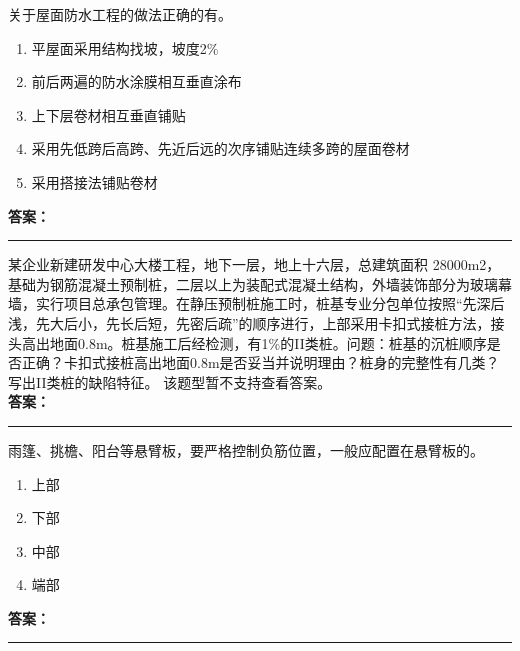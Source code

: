 \documentclass[UTF8,fontset=fandol,11pt]{ctexart}
\newcommand{\answerline}{\textcolor{answerred}{\rule{2.4cm}{0.7pt}}}
\begin{document}
\begin{quizbox}[title={乱序第 201 题｜第九章防水工程}]

关于屋面防水工程的做法正确的有。\\

\begin{enumerate}[label=\Alph*.]

\item 平屋面采用结构找坡，坡度2\%

\item 前后两遍的防水涂膜相互垂直涂布

\item 上下层卷材相互垂直铺贴

\item 采用先低跨后高跨、先近后远的次序铺贴连续多跨的屋面卷材

\item 采用搭接法铺贴卷材

\end{enumerate}

\textbf{\textcolor{answerred}{答案：}} \answerline

\end{quizbox}

\vspace{0.2em}

\begin{quizbox}[title={乱序第 202 题｜第二章桩基础工程}]

某企业新建研发中心大楼工程，地下一层，地上十六层，总建筑面积 28000m2，基础为钢筋混凝土预制桩，二层以上为装配式混凝土结构，外墙装饰部分为玻璃幕墙，实行项目总承包管理。在静压预制桩施工时，桩基专业分包单位按照“先深后浅，先大后小，先长后短，先密后疏”的顺序进行，上部采用卡扣式接桩方法，接头高出地面0.8m。桩基施工后经检测，有1\%的II类桩。问题：桩基的沉桩顺序是否正确？卡扣式接桩高出地面0.8m是否妥当并说明理由？桩身的完整性有几类？写出II类桩的缺陷特征。 该题型暂不支持查看答案。\\

\textbf{\textcolor{answerred}{答案：}} \answerline

\end{quizbox}

\vspace{0.2em}

\begin{quizbox}[title={乱序第 203 题｜第四章混凝土结构工程}]

雨篷、挑檐、阳台等悬臂板，要严格控制负筋位置，一般应配置在悬臂板的。\\

\begin{enumerate}[label=\Alph*.]

\item 上部

\item 下部

\item 中部

\item 端部

\end{enumerate}

\textbf{\textcolor{answerred}{答案：}} \answerline

\end{quizbox}
\end{document}
